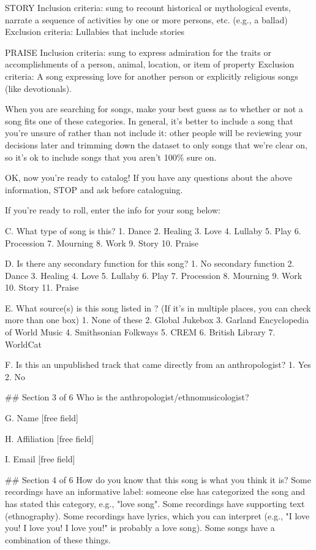 STORY
Inclusion criteria: sung to recount historical or mythological events, narrate a sequence of activities by one or more persons, etc. (e.g., a ballad)
Exclusion criteria: Lullabies that include stories

PRAISE
Inclusion criteria: sung to express admiration for the traits or accomplishments of a person, animal, location, or item of property
Exclusion criteria: A song expressing love for another person or explicitly religious songs (like devotionals).

When you are searching for songs, make your best guess as to whether or not a song fits one of these categories. In general, it's better to include a song that you're unsure of rather than not include it: other people will be reviewing your decisions later and trimming down the dataset to only songs that we're clear on, so it's ok to include songs that you aren't 100\% sure on.

OK, now you're ready to catalog!
If you have any questions about the above information, STOP and ask before cataloguing.

If you're ready to roll, enter the info for your song below:

C. What type of song is this?
1. Dance
2. Healing
3. Love
4. Lullaby
5. Play
6. Procession
7. Mourning
8. Work
9. Story
10. Praise

D. Is there any secondary function for this song?
1. No secondary function
2. Dance
3. Healing
4. Love
5. Lullaby
6. Play
7. Procession
8. Mourning
9. Work
10. Story
11. Praise

E. What source(s) is this song listed in ? (If it's in multiple places, you can check more than one box)
1. None of these
2. Global Jukebox
3. Garland Encyclopedia of World Music
4. Smithsonian Folkways
5. CREM
6. British Library
7. WorldCat

F. Is this an unpublished track that came directly from an anthropologist?
1. Yes
2. No

## Section 3 of 6
Who is the anthropologist/ethnomusicologist?

G. Name
[free field]

H. Affiliation
[free field]

I. Email
[free field]

## Section 4 of 6
How do you know that this song is what you think it is?
Some recordings have an informative label: someone else has categorized the song and has stated this category, e.g., "love song".
Some recordings have supporting text (ethnography).
Some recordings have lyrics, which you can interpret (e.g., "I love you! I love you! I love you!" is probably a love song). Some songs have a combination of these things.

